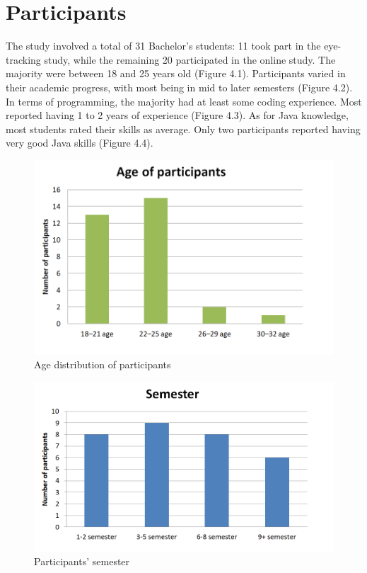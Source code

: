 \section{Participants}

The study involved a total of 31 Bachelor’s students: 11 took part in the eye-tracking study, while the remaining 20 participated in the online study. The majority were between 18 and 25 years old (Figure 4.1).
Participants varied in their academic progress, with most being in mid to later semesters (Figure 4.2).
In terms of programming, the majority had at least some coding experience. Most reported having 1 to 2 years of experience (Figure 4.3).
As for Java knowledge, most students rated their skills as average. Only two participants reported having very good Java skills (Figure 4.4).


\begin{figure} [H]
  \centering
  \includegraphics[scale=0.8]{figures/age.png}
  \caption{Age distribution of participants}
  \label{fig:AnhangsChor}
\end{figure}


\begin{figure} [H]
  \centering
  \includegraphics[scale=0.8]{figures/semester.png}
  \caption{Participants' semester}
  \label{fig:AnhangsChor}
\end{figure}

